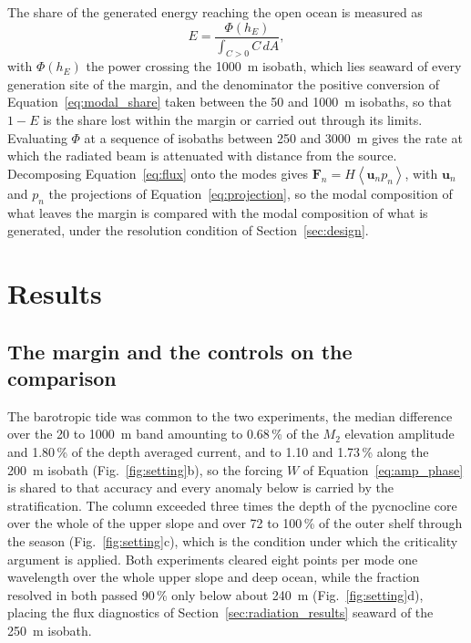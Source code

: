 \documentclass[a4paper,fleqn]{cas-sc}
\begin{document}
The share of the generated energy reaching the open ocean is measured as
\begin{equation}
E=\frac{\Phi(h_{E})}{\displaystyle\int_{C>0}C\,dA} ,
\label{eq:radiated}
\end{equation}
with $\Phi(h_{E})$ the power crossing the 1000~m isobath, which lies seaward of every generation site of the margin, and the denominator the positive conversion of Equation~\ref{eq:modal_share} taken between the 50 and 1000~m isobaths, so that $1-E$ is the share lost within the margin or carried out through its limits. Evaluating $\Phi$ at a sequence of isobaths between 250 and 3000~m gives the rate at which the radiated beam is attenuated with distance from the source. Decomposing Equation~\ref{eq:flux} onto the modes gives $\mathbf{F}_{n}=H\left\langle \mathbf{u}_{n}p_{n}\right\rangle$, with $\mathbf{u}_{n}$ and $p_{n}$ the projections of Equation~\ref{eq:projection}, so the modal composition of what leaves the margin is compared with the modal composition of what is generated, under the resolution condition of Section~\ref{sec:design}.


\section{Results}

\subsection{The margin and the controls on the comparison}
\label{sec:regime}

The barotropic tide was common to the two experiments, the median difference over the 20 to 1000~m band amounting to 0.68\,\% of the $M_{2}$ elevation amplitude and 1.80\,\% of the depth averaged current, and to 1.10 and 1.73\,\% along the 200~m isobath (Fig.~\ref{fig:setting}b), so the forcing $W$ of Equation~\ref{eq:amp_phase} is shared to that accuracy and every anomaly below is carried by the stratification. The column exceeded three times the depth of the pycnocline core over the whole of the upper slope and over 72 to 100\,\% of the outer shelf through the season (Fig.~\ref{fig:setting}c), which is the condition under which the criticality argument is applied. Both experiments cleared eight points per mode one wavelength over the whole upper slope and deep ocean, while the fraction resolved in both passed 90\,\% only below about 240~m (Fig.~\ref{fig:setting}d), placing the flux diagnostics of Section~\ref{sec:radiation_results} seaward of the 250~m isobath.
\end{document}

